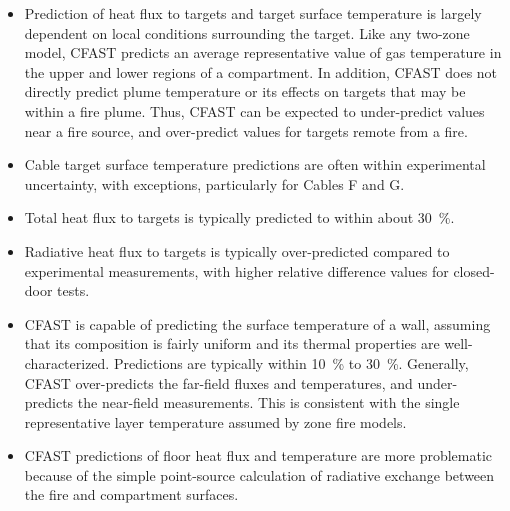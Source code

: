 \begin{itemize}
\item  Prediction of heat flux to targets and target surface temperature is largely dependent on local conditions surrounding the target.  Like any two-zone model, CFAST predicts an average representative value of gas temperature in the upper and lower regions of a compartment.  In addition, CFAST does not directly predict plume temperature or its effects on targets that may be within a fire plume.  Thus, CFAST can be expected to under-predict values near a fire source, and over-predict values for targets remote from a fire.
\item Cable target surface temperature predictions are often within experimental uncertainty, with exceptions, particularly for Cables F and G.
\item Total heat flux to targets is typically predicted to within about 30~\%.
\item Radiative heat flux to targets is typically over-predicted compared to experimental measurements, with higher relative difference values for closed-door tests.
\item CFAST is capable of predicting the surface temperature of a wall, assuming that its composition is fairly uniform and its thermal properties are well-characterized.  Predictions are typically within 10~\% to 30~\%.  Generally, CFAST over-predicts the far-field fluxes and temperatures, and under-predicts the near-field measurements.  This is consistent with the single representative layer temperature assumed by zone fire models.
\item CFAST predictions of floor heat flux and temperature are more problematic because of the simple point-source calculation of radiative exchange between the fire and compartment surfaces.
\end{itemize}

